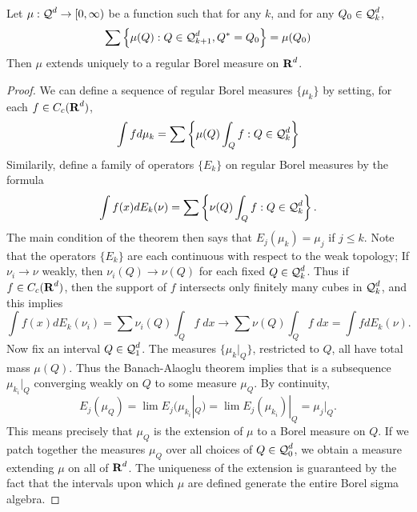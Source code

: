 \begin{lemma}
	Let $\mu: \operatorname{\mathcal{Q}}^d \to [0,\infty)$ be a function such that for any $k$, and for any $Q_0 \in \operatorname{\mathcal{Q}}^d_k$,
	\[ \sum \left\{ \mu(Q) : Q \in \operatorname{\mathcal{Q}}^d_{k+1}, Q^* = Q_0 \right\} = \mu(Q_0) \]
	Then $\mu$ extends uniquely to a regular Borel measure on $\operatorname{\mathbf{R}}^d$.
\end{lemma}
\begin{proof}
	We can define a sequence of regular Borel measures $\{ \mu_k \}$ by setting, for each $f \in C_c(\operatorname{\mathbf{R}}^d)$,
	\[ \int f d\mu_k = \sum \left\{ \mu(Q) \int_Q f : Q \in \operatorname{\mathcal{Q}}_k^d \right\} \]
	Similarily, define a family of operators $\{ E_k \}$ on regular Borel measures by the formula
	\[ \int f(x) dE_k(\nu) = \sum \left\{ \nu(Q) \int_Q f : Q \in \operatorname{\mathcal{Q}}_k^d \right\}. \]
	The main condition of the theorem then says that $E_j(\mu_k) = \mu_j$ if $j \leq k$. Note that the operators $\{ E_k \}$ are each continuous with respect to the weak topology; If $\nu_i \to \nu$ weakly, then $\nu_i(Q) \to \nu(Q)$ for each fixed $Q \in \operatorname{\mathcal{Q}}_k^d$. Thus if $f \in C_c(\operatorname{\mathbf{R}}^d)$, then the support of $f$ intersects only finitely many cubes in $\operatorname{\mathcal{Q}}_k^d$, and this implies
	\[ \int f(x) dE_k(\nu_i) = \sum \nu_i(Q) \int_Q f\; dx \to \sum \nu(Q) \int_Q f\; dx = \int f dE_k(\nu). \]
	Now fix an interval $Q \in \operatorname{\mathcal{Q}}_1^d$. The measures $\{ \mu_k|_Q \}$, restricted to $Q$, all have total mass $\mu(Q)$. Thus the Banach-Alaoglu theorem implies that is a subsequence $\mu_{k_i}|_Q$ converging weakly on $Q$ to some measure $\mu_Q$. By continuity,
	\[ E_j(\mu_Q) = \lim E_j(\mu_{k_i}|_Q) = \lim E_j(\mu_{k_i})|_Q = \mu_j|_Q. \]
	This means precisely that $\mu_Q$ is the extension of $\mu$ to a Borel measure on $Q$. If we patch together the measures $\mu_Q$ over all choices of $Q \in \operatorname{\mathcal{Q}}_0^d$, we obtain a measure extending $\mu$ on all of $\operatorname{\mathbf{R}}^d$. The uniqueness of the extension is guaranteed by the fact that the intervals upon which $\mu$ are defined generate the entire Borel sigma algebra.
\end{proof}


